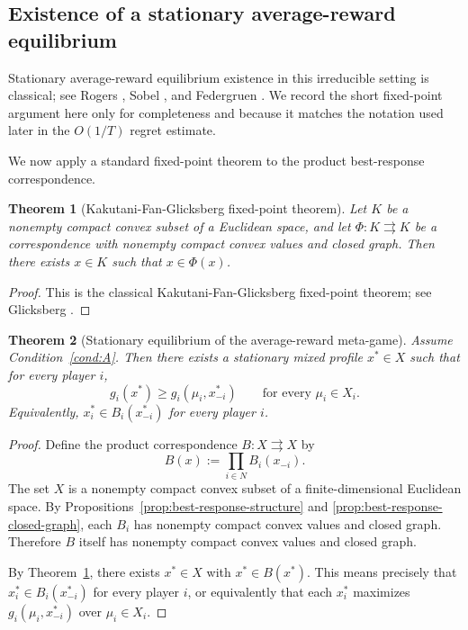 \documentclass[11pt]{article}
\newtheorem{theorem}{Theorem}[section]
\theoremstyle{definition}
\newcommand{\1}{\mathbf{1}}
\begin{document}
\subsection{Existence of a stationary average-reward equilibrium}

Stationary average-reward equilibrium existence in this irreducible setting is classical; see Rogers \cite{Rogers1969}, Sobel \cite{Sobel1971}, and Federgruen \cite{Federgruen1978}. We record the short fixed-point argument here only for completeness and because it matches the notation used later in the $O(1/T)$ regret estimate.

We now apply a standard fixed-point theorem to the product best-response correspondence.

\begin{theorem}[Kakutani-Fan-Glicksberg fixed-point theorem]\label{thm:kfg}
Let $K$ be a nonempty compact convex subset of a Euclidean space, and let $\Phi:K\rightrightarrows K$ be a correspondence with nonempty compact convex values and closed graph. Then there exists $x\in K$ such that $x\in \Phi(x)$.
\end{theorem}

\begin{proof}
This is the classical Kakutani-Fan-Glicksberg fixed-point theorem; see Glicksberg \cite{Glicksberg1952}.
\end{proof}

\begin{theorem}[Stationary equilibrium of the average-reward meta-game]\label{thm:meta-equilibrium}
Assume Condition~\ref{cond:A}. Then there exists a stationary mixed profile $x^*\in X$ such that for every player $i$,
\[
g_i(x^*)\ge g_i(\mu_i,x_{-i}^*)\qquad\text{for every }\mu_i\in X_i.
\]
Equivalently, $x_i^*\in B_i(x_{-i}^*)$ for every player $i$.
\end{theorem}

\begin{proof}
Define the product correspondence $B:X\rightrightarrows X$ by
\[
B(x):=\prod_{i\in N}B_i(x_{-i}).
\]
The set $X$ is a nonempty compact convex subset of a finite-dimensional Euclidean space. By Propositions~\ref{prop:best-response-structure} and \ref{prop:best-response-closed-graph}, each $B_i$ has nonempty compact convex values and closed graph. Therefore $B$ itself has nonempty compact convex values and closed graph.

By Theorem~\ref{thm:kfg}, there exists $x^*\in X$ with $x^*\in B(x^*)$. This means precisely that $x_i^*\in B_i(x_{-i}^*)$ for every player $i$, or equivalently that each $x_i^*$ maximizes $g_i(\mu_i,x_{-i}^*)$ over $\mu_i\in X_i$.
\end{proof}
\end{document}
